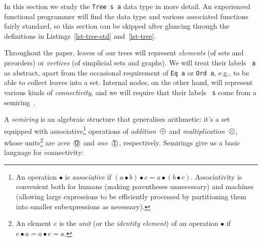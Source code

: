 \documentclass[crc,english]{programming}
\newcommand{\hcode}[1]{{\color{darkblue} \lstinline[keywordstyle={}]|#1|}} %
\newcommand{\add}{\text{\raisebox{-0.1mm}{\large $\oplus$}}}
\newcommand{\mul}{\text{\raisebox{-0.1mm}{\large $\otimes$}}}
\newcommand{\zero}{\raisebox{-0.2mm}{\textcircled{\textsf{0}}}\xspace}
\newcommand{\one}{\raisebox{-0.2mm}{\textcircled{\textsf{\hspace{-0.2mm}1}}}\xspace}
\begin{document}
In this section we study the \hcode{Tree s a} data type in more detail. An
experienced functional programmer will find the data type and various
associated functions fairly standard, so this section can be skipped after
glancing through the definitions in Listings~\ref{lst-tree-std}
and~\ref{lst-tree}.

Throughout the paper, leaves of our trees will represent \emph{elements} (of
sets and preorders) or \emph{vertices} (of simplicial sets and graphs). We will
treat their labels~\hcode{a} as abstract, apart from the occasional requirement
of \hcode{Eq a} or \hcode{Ord a}, e.g., to be able to collect leaves into a set.
Internal nodes, on the other hand, will represent various kinds of
\emph{connectivity}, and we will require that their labels~\hcode{s} come from
a semiring~\cite{1999_semirings_golan}.

A \emph{semiring} is an algebraic structure that generalises arithmetic: it's a
set equipped with associative\footnote{
    An operation $\bullet$ is \emph{associative} if
    $(a \bullet b) \bullet c = a \bullet (b \bullet c)$. Associativity is
    convenient both for humans (making parentheses unnecessary) and machines
    (allowing large expressions to be efficiently processed by partitioning them
    into smaller subexpressions as necessary).
}
operations of \emph{addition}~$\add$ and \emph{multiplication}~$\mul$, whose
units\footnote{
    An element $e$ is the \emph{unit} (or the \emph{identity element}) of an
    operation $\bullet$ if $e \bullet a = a \bullet e = a$.
}
are \emph{zero}~$\text{\zero}$ and \emph{one}~$\text{\one}$, respectively.
Semirings give us a basic language for connectivity:
\end{document}
